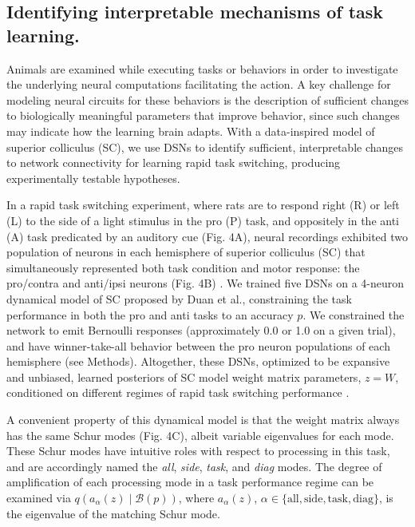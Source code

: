 \documentclass[11pt]{article}
\begin{document}
\subsection{Identifying interpretable mechanisms of task learning.}
Animals are examined while executing tasks or behaviors in order to investigate the underlying neural computations facilitating the action.   
A key challenge for modeling neural circuits for these behaviors is the description of sufficient changes to biologically meaningful parameters that improve behavior, since such changes may indicate how the learning brain adapts.  
With a data-inspired model of superior colliculus (SC), we use DSNs to identify sufficient, interpretable changes to network connectivity for learning rapid task switching, producing experimentally testable hypotheses.

In a rapid task switching experiment, where rats are to respond right (R) or left (L) to the side of a light stimulus in the pro (P) task, and oppositely in the anti (A) task predicated by an auditory cue (Fig. 4A), neural recordings exhibited two population of neurons in each hemisphere of superior colliculus (SC) that simultaneously represented both task condition and motor response: the pro/contra and anti/ipsi neurons (Fig. 4B) \cite{duan2018collicular}. 
We trained five DSNs on a 4-neuron dynamical model of SC proposed by Duan et al.,  constraining the task performance in both the pro and anti tasks to an accuracy $p$.  
We constrained the network to emit Bernoulli responses (approximately 0.0 or 1.0 on a given trial), and have winner-take-all behavior between the pro neuron populations of each hemisphere (see Methods). 
Altogether, these DSNs, optimized to be expansive and unbiased, learned posteriors of SC model weight matrix parameters, $z = W$, conditioned on different regimes of rapid task switching performance .

A convenient property of this dynamical model is that the weight matrix always has the same Schur modes (Fig. 4C), albeit variable eigenvalues for each mode.  These Schur modes have intuitive roles with respect to processing in this task, and are accordingly named the \textit{all}, \textit{side}, \textit{task}, and \textit{diag} modes.  The degree of amplification of each processing mode in a task performance regime can be examined via $q(a_\alpha(z) \mid \mathcal{B}(p))$, where $a_\alpha(z)$, $\alpha \in \{\text{all}, \text{side}, \text{task}, \text{diag} \}$, is the eigenvalue of the matching Schur mode.   \\
\end{document}
